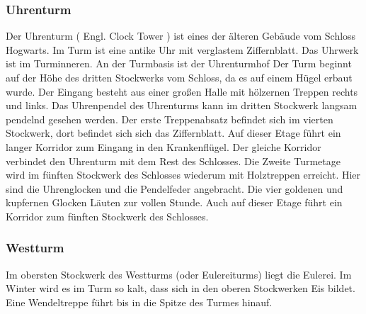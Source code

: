\documentclass[a4paper, 10pt]{article}
\begin{document}
\subsubsection*{\large Uhrenturm}
Der Uhrenturm (  Engl.  Clock Tower ) ist eines der älteren Gebäude vom Schloss Hogwarts. Im Turm ist eine antike Uhr mit verglastem Ziffernblatt. Das Uhrwerk ist im Turminneren. An der Turmbasis ist der Uhrenturmhof
\vspace{10pt}
\newline
Der Turm beginnt auf der Höhe des dritten Stockwerks vom Schloss, da es auf einem Hügel erbaut wurde. Der Eingang besteht aus einer großen Halle mit hölzernen Treppen rechts und links. Das Uhrenpendel des Uhrenturms kann im dritten Stockwerk langsam pendelnd gesehen werden. Der erste Treppenabsatz befindet sich im vierten Stockwerk, dort befindet sich sich das Ziffernblatt. Auf dieser Etage führt ein langer Korridor zum Eingang in den Krankenflügel. Der gleiche Korridor verbindet den Uhrenturm mit dem Rest des Schlosses.
\vspace{10pt}
\newline
Die Zweite Turmetage wird im fünften Stockwerk des Schlosses wiederum mit Holztreppen erreicht. Hier sind die Uhrenglocken und die Pendelfeder angebracht. Die vier goldenen und kupfernen Glocken Läuten zur vollen Stunde. Auch auf dieser Etage führt ein Korridor zum fünften Stockwerk des Schlosses.
\subsubsection*{\large Westturm}
Im obersten Stockwerk des Westturms (oder Eulereiturms) liegt die Eulerei. Im Winter wird es im Turm so kalt, dass sich in den oberen Stockwerken Eis bildet. Eine Wendeltreppe führt bis in die Spitze des Turmes hinauf.
\end{document}
